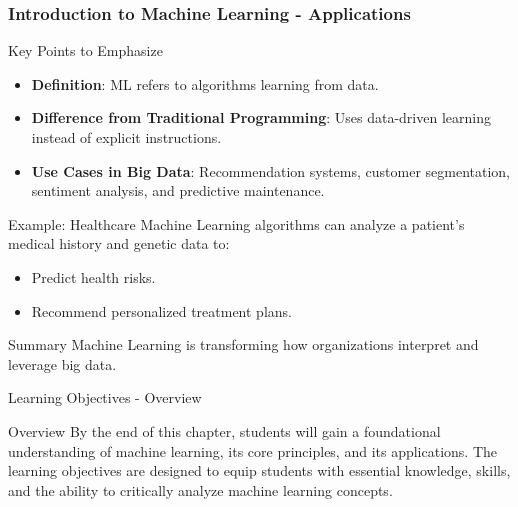 \documentclass[aspectratio=169]{beamer}
\begin{document}
\begin{frame}[fragile]
    \frametitle{Introduction to Machine Learning - Applications}
    \begin{block}{Key Points to Emphasize}
        \begin{itemize}
            \item \textbf{Definition}: ML refers to algorithms learning from data.
            \item \textbf{Difference from Traditional Programming}: Uses data-driven learning instead of explicit instructions.
            \item \textbf{Use Cases in Big Data}: Recommendation systems, customer segmentation, sentiment analysis, and predictive maintenance.
        \end{itemize}
    \end{block}

    \begin{block}{Example: Healthcare}
        Machine Learning algorithms can analyze a patient's medical history and genetic data to:
        \begin{itemize}
            \item Predict health risks.
            \item Recommend personalized treatment plans.
        \end{itemize}
    \end{block}

    \begin{block}{Summary}
        Machine Learning is transforming how organizations interpret and leverage big data.
    \end{block}
\end{frame}

\begin{frame}[fragile]{Learning Objectives - Overview}
    \begin{block}{Overview}
        By the end of this chapter, students will gain a foundational understanding of machine learning, its core principles, and its applications. 
        The learning objectives are designed to equip students with essential knowledge, skills, and the ability to critically analyze machine learning concepts.
    \end{block}
\end{frame}
\end{document}
